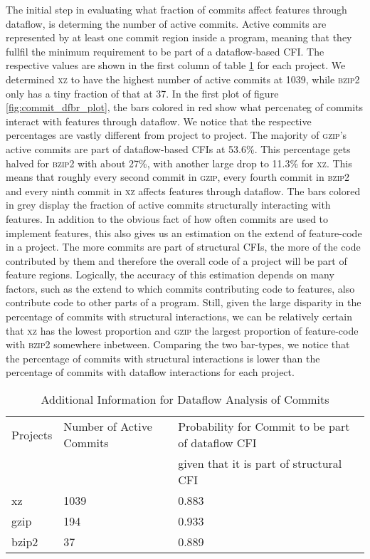 The initial step in evaluating what fraction of commits affect features through dataflow, is determing the number of active commits.
Active commits are represented by at least one commit region inside a program, meaning that they fullfil the minimum requirement to be part of a dataflow-based CFI.
The respective values are shown in the first column of table \ref{tab:commit_dfbr_table} for each project.
We determined \textsc{xz} to have the highest number of active commits at 1039, while \textsc{bzip2} only has a tiny fraction of that at 37.
In the first plot of figure \ref{fig:commit_dfbr_plot}, the bars colored in red show what percenateg of commits interact with features through dataflow.
We notice that the respective percentages are vastly different from project to project.
The majority of \textsc{gzip}'s active commits are part of dataflow-based CFIs at 53.6\%.
This percentage gets halved for \textsc{bzip2} with about 27\%, with another large drop to 11.3\% for \textsc{xz}.
This means that roughly every second commit in \textsc{gzip}, every fourth commit in \textsc{bzip2} and every ninth commit in \textsc{xz} affects features through dataflow.
The bars colored in grey display the fraction of active commits structurally interacting with features.
In addition to the obvious fact of how often commits are used to implement features, this also gives us an estimation on the extend of feature-code in a project.
The more commits are part of structural CFIs, the more of the code contributed by them and therefore the overall code of a project will be part of feature regions.
Logically, the accuracy of this estimation depends on many factors, such as the extend to which commits contributing code to features, also contribute code to other parts of a program.
Still, given the large disparity in the percentage of commits with structural interactions, we can be relatively certain that \textsc{xz} has the lowest proportion and \textsc{gzip} the largest proportion of feature-code with \textsc{bzip2} somewhere inbetween.
Comparing the two bar-types, we notice that the percentage of commits with structural interactions is lower than the percentage of commits with dataflow interactions for each project.

\begin{table}[t]
\caption{Additional Information for Dataflow Analysis of Commits}
\label{tab:commit_dfbr_table}
\begin{tabular}{lll}
 Projects & Number of Active Commits & Probability for Commit to be part of dataflow CFI \\
 	  & 			     & given that it is part of structural CFI \\
xz & 1039 & 0.883 \\
gzip & 194 & 0.933 \\
bzip2 & 37 & 0.889 \\
\end{tabular}
\end{table}

